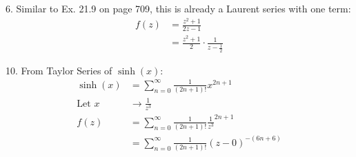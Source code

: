 \documentclass[11pt]{homework}
\begin{document}
6. Similar to Ex. 21.9 on page 709, this is already a Laurent series with one term:
\begin{align*}
f(z) &= \frac{ z^2+1}{2z-1} \\
     &= \frac{ z^2+1}{2} \cdot \frac{1}{z-\frac{1}{2}} 
\end{align*}

10. From Taylor Series of $\sinh(x)$:
\begin{align*}
\sinh(x) &= \sum_{n=0}^\infty \frac{1 }{(2n+1)!} x^{2n+1} \\
\text{Let } x &\rightarrow  \frac{1}{z^3} \\ 
f(z) &=\sum_{n=0}^\infty \frac{ 1 }{(2n+1)!} \frac{1}{z^3}^{2n+1} \\
  &= \sum_{n=0}^\infty \frac{ 1 }{(2n+1)!} (z-0)^{-(6n+6)} 
\end{align*}
\end{document}
